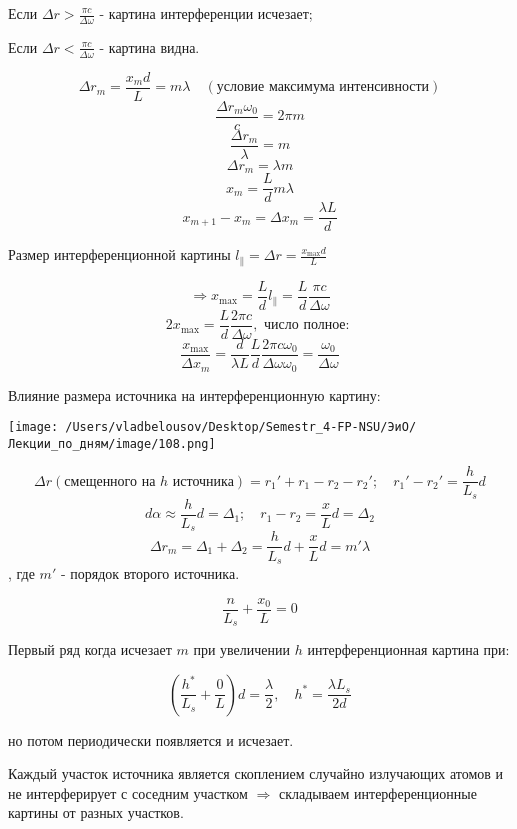 \documentclass[12pt, a4paper]{report}
\begin{document}
Если \( \Delta r > \displaystyle  \frac{ \pi c }{\Delta \omega }   \) - картина интерференции исчезает; 

\vspace{10pt}

Если \( \displaystyle  \Delta r < \frac{\pi c }{\Delta \omega }  \) - картина видна.

\[ \Delta r_m = \frac{ x_m d }{L } = m \lambda \quad  (\text{условие максимума интенсивности} )  \] 
\[ \frac{\Delta r_m \omega_0 }{c } = 2 \pi m   \] 
\[ \frac{\Delta r_m }{\lambda }     = m   \] 
\[ \Delta r_m = \lambda m  \] 
\[ x_m = \frac{L }{d} m \lambda   \] 
\[ x_{m+1 } - x_m = \Delta x_m = \frac{\lambda L }{d}  \] 

Размер интерференционной картины \( \displaystyle  l_{\parallel} = \Delta r = \frac{x_{ \max  } d }{L }   \) 

\[ \Rightarrow  x_{ \max  } = \frac{L}{d } l_{ \parallel} = \frac{L}{d }  \frac{\pi c }{\Delta \omega }    \] 
\[ 2 x_{ \max  } = \frac{L}{d }  \frac{ 2 \pi c }{\Delta \omega } , \text{ число полное: }    \] 
\[ \frac{x _{ \max  } }{\Delta x_m }= \frac{d}{ \lambda L } \frac{L }{d} \frac{ 2 \pi c \omega_0 }{\Delta \omega \omega_0} = \frac{\omega_0}{\Delta \omega}      \] 

Влияние размера источника на интерференционную картину: 

\begin{center}
    \texttt{[image: /Users/vladbelousov/Desktop/Semestr\_4-FP-NSU/ЭиО/Лекции\_по\_дням/image/108.png]}
\end{center} 

\[ \Delta r (\text{смещенного на } h \text{ источника} ) = r_1 ' + r_1 - r_2 -r_2 ' ; \quad  r_1 ' - r_2 ' = \frac{h}{L_s } d \] 
\[ d \alpha \approx \frac{h}{L_s} d = \Delta_1 ;\quad  r_1 -r_2 = \frac{x}{L }  d = \Delta_2  \] 
\[ \Delta r_m = \Delta_1 + \Delta_2 = \frac{h}{L_s } d + \frac{x}{L }  d = m' \lambda   \]
, где \( m '  \) - порядок второго источника. 

\[ \frac{n}{L_s } + \frac{x_0 }{L } = 0   \] 

Первый ряд когда исчезает \( m  \) при увеличении \( h \) интерференционная картина при:

\[ \displaystyle  \left( \frac{h^* }{L_s } + \frac{0}{L }   \right)d = \frac{\lambda}{2 }  , \quad  h^* = \frac{\lambda L_s}{2d}  \] 

но потом периодически появляется и исчезает.

Каждый участок источника является скоплением случайно излучающих атомов и не интерферирует с соседним участком \( \Rightarrow \)  складываем интерференционные картины от разных участков.
\end{document}
